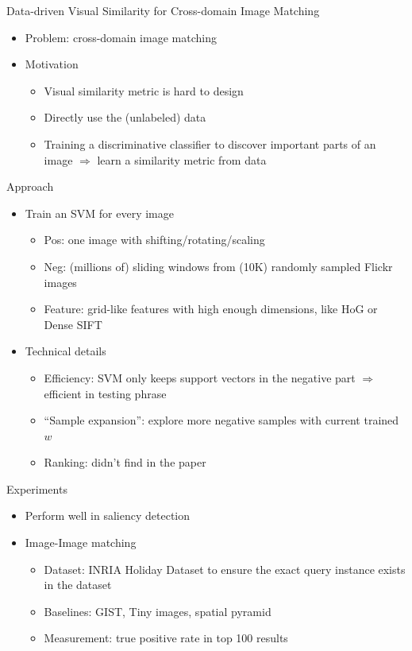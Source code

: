 \documentclass[12pt]{beamer}
\begin{document}
\begin{frame}{Data-driven Visual Similarity for Cross-domain Image Matching}
	\begin{itemize}
		\item Problem: cross-domain image matching
		\item Motivation
		\begin{itemize}
			\item Visual similarity metric is hard to design
			\item Directly use the (unlabeled) data
			\item Training a discriminative classifier to discover important parts of an image $\Rightarrow$ learn a similarity metric from data
		\end{itemize}
	\end{itemize}
\end{frame}

\begin{frame}{Approach}
	\begin{itemize}
		\item Train an SVM for every image
		\begin{itemize}
			\item Pos: one image with shifting/rotating/scaling
			\item Neg: (millions of) sliding windows from (10K) randomly sampled Flickr images
			\item Feature: grid-like features with high enough dimensions, like HoG or Dense SIFT
		\end{itemize}
		\item Technical details
		\begin{itemize}
			\item Efficiency: SVM only keeps support vectors in the negative part $\Rightarrow$ efficient in testing phrase
			\item ``Sample expansion'': explore more negative samples with current trained $w$
			\item Ranking: didn't find in the paper
		\end{itemize}
	\end{itemize}
\end{frame}

\begin{frame}{Experiments}
	\begin{itemize}
		\item Perform well in saliency detection
		\item Image-Image matching
		\begin{itemize}
			\item Dataset: INRIA Holiday Dataset to ensure the exact query instance exists in the dataset
			\item Baselines: GIST, Tiny images, spatial pyramid
			\item Measurement: true positive rate in top 100 results
		\end{itemize}
	\end{itemize}
\end{frame}
\end{document}
